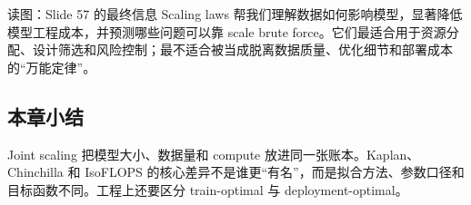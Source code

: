 \begin{importantbox}{读图：Slide 57 的最终信息}
Scaling laws 帮我们理解数据如何影响模型，显著降低模型工程成本，并预测哪些问题可以靠 scale brute force。它们最适合用于资源分配、设计筛选和风险控制；最不适合被当成脱离数据质量、优化细节和部署成本的“万能定律”。
\end{importantbox}

\subsection{本章小结}

Joint scaling 把模型大小、数据量和 compute 放进同一张账本。Kaplan、Chinchilla 和 IsoFLOPS 的核心差异不是谁更“有名”，而是拟合方法、参数口径和目标函数不同。工程上还要区分 train-optimal 与 deployment-optimal。

